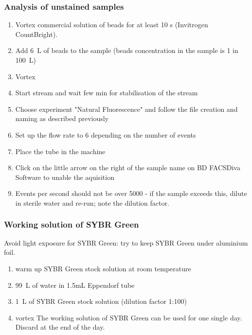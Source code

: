 \subsubsection{Analysis of unstained samples}

\begin{enumerate}
\item Vortex commercial solution of beads for at least 10 s (Invitrogen CountBright).
\item Add 6~\textmu L of beads to the sample (beads concentration in the sample is 1 in 100~\textmu L)
\item Vortex 
\item Start stream and wait few min for stabilisation of the stream
\item Choose experiment "Natural Fluorescence" and follow the file creation and naming as described previously
\item Set up the flow rate to 6 depending on the number of events 
\item Place the tube in the machine
\item Click on the little arrow on the right of the sample name on BD FACSDiva Software to unable the aquisition
\item Events per second should not be over 5000 - if the sample exceeds this, dilute in sterile water and re-run; note the dilution factor.
\end{enumerate}

\subsubsection{Working solution of SYBR Green}
Avoid light exposure for SYBR Green: try to keep SYBR Green under aluminium foil.
\begin{enumerate}
\item warm up SYBR Green stock solution at room temperature
\item 99~\textmu L of water in 1.5mL Eppendorf tube
\item 1~\textmu L of SYBR Green stock solution (dilution factor 1:100)
\item vortex
The working solution of SYBR Green can be used for one single day. Discard at the end of the day.
\end{enumerate}

